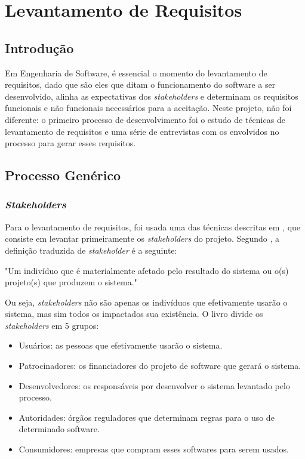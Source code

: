 \chapter{Levantamento de Requisitos}

\section{Introdução}
Em Engenharia de Software, é essencial o momento do levantamento de requisitos, dado que são eles que ditam o funcionamento do software a ser desenvolvido, alinha as expectativas dos \textit{stakeholders} e determinam os requisitos funcionais e não funcionais necessários para a aceitação. Neste projeto, não foi diferente: o primeiro processo de desenvolvimento foi o estudo de técnicas de levantamento de requisitos e uma série de entrevistas com os envolvidos no processo para gerar esses requisitos.

\section{Processo Genérico}

\subsection{\textit{Stakeholders}}

Para o levantamento de requisitos, foi usada uma das técnicas descritas em \cite{kurtbittnerianspence2002}, que consiste em levantar primeiramente os \textit{stakeholders} do projeto. Segundo \cite{kurtbittnerianspence2002}, a definição traduzida de \textit{stakeholder} é a seguinte:

\begin{citacaoLonga}
"Um indivíduo que é materialmente afetado pelo resultado do
sistema ou o(s) projeto(s) que produzem o sistema."
\end{citacaoLonga}

Ou seja, \textit{stakeholders} não são apenas os indivíduos que efetivamente usarão o sistema, mas sim todos os impactados sua existência. O livro divide os \textit{stakeholders} em 5 grupos:

\begin{itemize}
    \item Usuários: as pessoas que efetivamente usarão o sistema.
    \item Patrocinadores: os financiadores do projeto de software que gerará o sistema.
    \item Desenvolvedores: os responsáveis por desenvolver o sistema levantado pelo processo.
    \item Autoridades: órgãos reguladores que determinam regras para o uso de determinado software.
    \item Consumidores: empresas que compram esses softwares para serem usados.
\end{itemize}

